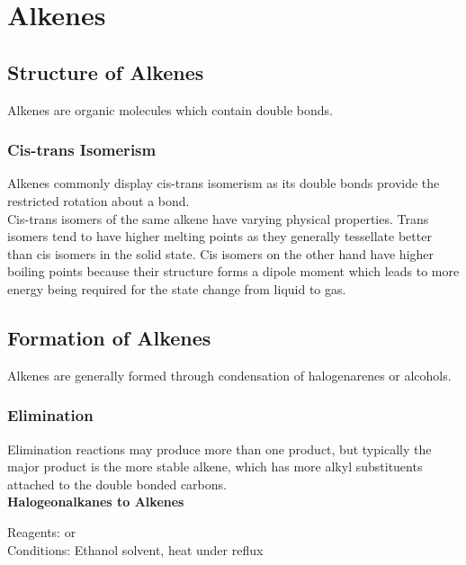 \documentclass[../main]{subfiles}
\begin{document}
\section{Alkenes}

	\subsection{Structure of Alkenes}

	Alkenes are organic molecules which contain  double bonds.

	\subsubsection{Cis-trans Isomerism}

	Alkenes commonly display cis-trans isomerism as its  double bonds provide the restricted rotation about a bond. \\

	Cis-trans isomers of the same alkene have varying physical properties. Trans isomers tend to have higher melting points as they generally tessellate better than cis isomers in the solid state. Cis isomers on the other hand have higher boiling points because their structure forms a dipole moment which leads to more energy being required for the state change from liquid to gas.

	\subsection{Formation of Alkenes}

	Alkenes are generally formed through condensation of halogenarenes or alcohols.

	\subsubsection{Elimination}

	Elimination reactions may produce more than one product, but typically the major product is the more stable alkene, which has more alkyl substituents attached to the double bonded carbons. \\

	\noindent \textbf{Halogeonalkanes to Alkenes}

	Reagents:  or  \\
	Conditions: Ethanol solvent, heat under reflux \\

\end{document}

